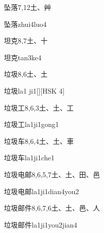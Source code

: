 \begin{entry}{坠落}{7,12}{⼟、⾋}
  \begin{phonetics}{坠落}{zhui4luo4}
  \end{phonetics}
\end{entry}

\begin{entry}{坦克}{8,7}{⼟、⼗}
  \begin{phonetics}{坦克}{tan3ke4}
  \end{phonetics}
\end{entry}

\begin{entry}{垃圾}{8,6}{⼟、⼟}
  \begin{phonetics}{垃圾}{la1 ji1}[][HSK 4]
  \end{phonetics}
\end{entry}

\begin{entry}{垃圾工}{8,6,3}{⼟、⼟、⼯}
  \begin{phonetics}{垃圾工}{la1ji1gong1}
  \end{phonetics}
\end{entry}

\begin{entry}{垃圾车}{8,6,4}{⼟、⼟、⾞}
  \begin{phonetics}{垃圾车}{la1ji1che1}
  \end{phonetics}
\end{entry}

\begin{entry}{垃圾电邮}{8,6,5,7}{⼟、⼟、⽥、⾢}
  \begin{phonetics}{垃圾电邮}{la1ji1dian4you2}
  \end{phonetics}
\end{entry}

\begin{entry}{垃圾邮件}{8,6,7,6}{⼟、⼟、⾢、⼈}
  \begin{phonetics}{垃圾邮件}{la1ji1you2jian4}
  \end{phonetics}
\end{entry}

